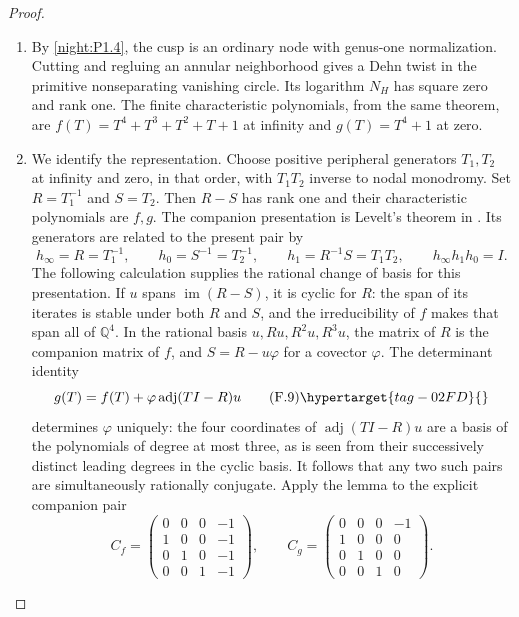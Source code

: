 \begin{proof}
\begin{enumerate}[label={$\langle1\rangle$\arabic*.}]
\item By \cref{night:P1.4}, the cusp is an ordinary node with
genus-one normalization. Cutting and regluing an annular neighborhood
gives a Dehn twist in the primitive nonseparating vanishing circle.
Its logarithm $N_H$ has square zero and rank one.
The finite characteristic polynomials, from the same theorem, are
$f(T)=T^4+T^3+T^2+T+1$ at infinity and $g(T)=T^4+1$ at zero.

\item We identify the representation.
Choose positive peripheral generators $T_1,T_2$ at infinity and
zero, in that order, with $T_1T_2$ inverse to nodal monodromy.
Set $R=T_1^{-1}$ and $S=T_2$.  Then $R-S$ has rank one and their
characteristic polynomials are $f,g$.  The companion presentation
is Levelt's theorem in \cite[Theorem 3.5, pp.~331--332;
Corollary 3.6, p.~332]{BeukersHeckman1989}.  Its generators are
related to the present pair by
\[
 h_\infty=R=T_1^{-1},\qquad h_0=S^{-1}=T_2^{-1},\qquad
 h_1=R^{-1}S=T_1T_2,\qquad h_\infty h_1h_0=I.
\]
The following calculation supplies the rational change
of basis for this presentation.
If $u$ spans $\operatorname{im}(R-S)$, it is cyclic for $R$:
the span of its iterates is stable under both $R$ and $S$, and
the irreducibility of $f$ makes that span all of $\mathbb Q^4$.
In the rational basis $u,Ru,R^2u,R^3u$, the matrix of $R$ is
the companion matrix of $f$, and $S=R-u\varphi$ for a covector
$\varphi$.  The determinant identity
\[
 g(T)=f(T)+\varphi\operatorname{adj}(TI-R)u
 \tag{F.9}\hypertarget{tag-02FD}{}\label{maps:eq:F.9}
\]
determines $\varphi$ uniquely: the four coordinates of
$\operatorname{adj}(TI-R)u$ are a basis of the polynomials of
degree at most three, as is seen from their successively distinct
leading degrees in the cyclic basis.  It follows that any two
such pairs are simultaneously rationally conjugate.  Apply the
lemma to the explicit companion pair
\[
 C_f=\begin{pmatrix}
 0&0&0&-1\\1&0&0&-1\\0&1&0&-1\\0&0&1&-1
 \end{pmatrix},\qquad
 C_g=\begin{pmatrix}
 0&0&0&-1\\1&0&0&0\\0&1&0&0\\0&0&1&0
 \end{pmatrix}.
\]
\end{enumerate}
\end{proof}
